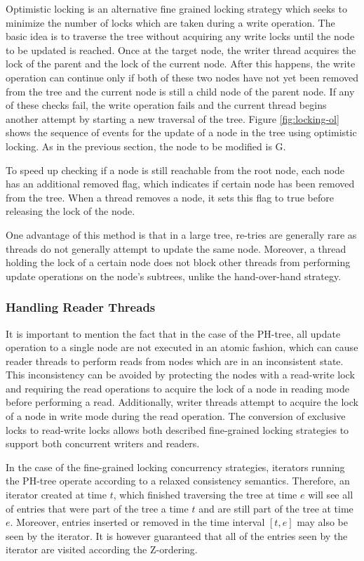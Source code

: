 \documentclass[11pt,a4paper]{globis-book}
\begin{document}
Optimistic locking is an alternative fine grained locking strategy which seeks to minimize the number of locks which are taken during a write operation. The basic idea is to traverse the tree without acquiring any write locks until the node to be updated is reached. Once at the target node, the writer thread acquires the lock of the parent and the lock of the current node. After this happens, the write operation can continue only if both of these two nodes have not yet been removed from the tree and the current node is still a child node of the parent node. If any of these checks fail, the write operation fails and the current thread begins another attempt by starting a new traversal of the tree. Figure \ref{fig:locking-ol} shows the sequence of events for the update of a node in the tree using optimistic locking. As in the previous section, the node to be modified is G. 

To speed up checking if a node is still reachable from the root node, each node has an additional removed flag, which indicates if certain node has been removed from the tree. When a thread removes a node, it sets this flag to true before releasing the lock of the node. 

One advantage of this method is that in a large tree, re-tries are generally rare as threads do not generally attempt to update the same node. Moreover, a thread holding the lock of a certain node does not block other threads from performing update operations on the node's subtrees, unlike the hand-over-hand strategy.

\subsubsection{Handling Reader Threads}
It is important to mention the fact that in the case of the PH-tree, all update operation to a single node are not executed in an atomic fashion, which can cause reader threads to perform reads from nodes which are in an inconsistent state. This inconsistency can be avoided by protecting the nodes with a read-write lock and requiring the read operations to acquire the lock of a node in reading mode before performing a read. Additionally, writer threads attempt to acquire the lock of a node in write mode during the read operation. The conversion of exclusive locks to read-write locks allows both described fine-grained locking strategies to support both concurrent writers and readers. 

In the case of the fine-grained locking concurrency strategies, iterators running the PH-tree operate according to a relaxed consistency semantics. Therefore, an iterator created at time $t$, which finished traversing the tree at time $e$ will see all of entries that were part of the tree a time $t$ and are still part of the tree at time $e$. Moreover, entries inserted or removed in the time interval $[t, e]$ may also be seen by the iterator. It is however guaranteed that all of the entries seen by the iterator are visited according the Z-ordering. 
\end{document}
